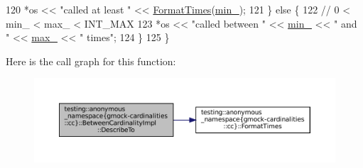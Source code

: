 \begin{DoxyCode}
120     *os << \textcolor{stringliteral}{"called at least "} << \hyperlink{namespacetesting_1_1anonymous__namespace_02gmock-cardinalities_8cc_03_a96225757688584c7c21d9a120bc74fd4}{FormatTimes}(\hyperlink{classtesting_1_1anonymous__namespace_02gmock-cardinalities_8cc_03_1_1BetweenCardinalityImpl_aaa6c70686dc7e205bd949c11b21648e8}{min\_});
121   \} \textcolor{keywordflow}{else} \{
122     \textcolor{comment}{// 0 < min\_ < max\_ < INT\_MAX}
123     *os << \textcolor{stringliteral}{"called between "} << \hyperlink{classtesting_1_1anonymous__namespace_02gmock-cardinalities_8cc_03_1_1BetweenCardinalityImpl_aaa6c70686dc7e205bd949c11b21648e8}{min\_} << \textcolor{stringliteral}{" and "} << \hyperlink{classtesting_1_1anonymous__namespace_02gmock-cardinalities_8cc_03_1_1BetweenCardinalityImpl_acf6f35b47bf9f52b714ccceb22255aeb}{max\_} << \textcolor{stringliteral}{" times"};
124   \}
125 \}
\end{DoxyCode}
Here is the call graph for this function\+:
\nopagebreak
\begin{figure}[H]
\begin{center}
\leavevmode
\includegraphics[width=350pt]{classtesting_1_1anonymous__namespace_02gmock-cardinalities_8cc_03_1_1BetweenCardinalityImpl_a8768e68b374d5a1103890284ea4fe332_cgraph}
\end{center}
\end{figure}
\mbox{\label{classtesting_1_1anonymous__namespace_02gmock-cardinalities_8cc_03_1_1BetweenCardinalityImpl_a2b97d2a30a5d86db1cec0a6b3e83588a}} 
